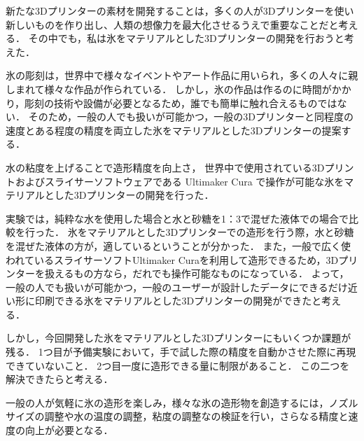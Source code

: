 新たな3Dプリンターの素材を開発することは，多くの人が3Dプリンターを使い新しいものを作り出し、人類の想像力を最大化させるうえで重要なことだと考える．
その中でも，私は氷をマテリアルとした3Dプリンターの開発を行おうと考えた．

氷の彫刻は，世界中で様々なイベントやアート作品に用いられ，多くの人々に親しまれて様々な作品が作られている．
しかし，氷の作品は作るのに時間がかかり，彫刻の技術や設備が必要となるため，誰でも簡単に触れ合えるものではない．
そのため，一般の人でも扱いが可能かつ，一般の3Dプリンターと同程度の速度とある程度の精度を両立した氷をマテリアルとした3Dプリンターの提案する．

水の粘度を上げることで造形精度を向上さ，
世界中で使用されている3Dプリントおよびスライサーソフトウェアである Ultimaker Cura で操作が可能な氷をマテリアルとした3Dプリンターの開発を行った．


実験では，純粋な水を使用した場合と水と砂糖を1：3で混ぜた液体での場合で比較を行った．
氷をマテリアルとした3Dプリンターでの造形を行う際，水と砂糖を混ぜた液体の方が，適しているということが分かった．
また，一般で広く使われているスライサーソフトUltimaker Curaを利用して造形できるため，3Dプリンターを扱えるもの方なら，だれでも操作可能なものになっている．
よって，一般の人でも扱いが可能かつ，一般のユーザーが設計したデータにできるだけ近い形に印刷できる氷をマテリアルとした3Dプリンターの開発ができたと考える．

しかし，今回開発した氷をマテリアルとした3Dプリンターにもいくつか課題が残る．
1つ目が予備実験において，手で試した際の精度を自動かさせた際に再現できていないこと．
2つ目一度に造形できる量に制限があること．
この二つを解決できたらと考える．

一般の人が気軽に氷の造形を楽しみ，様々な氷の造形物を創造するには，ノズルサイズの調整や水の温度の調整，粘度の調整なの検証を行い，さらなる精度と速度の向上が必要となる．




